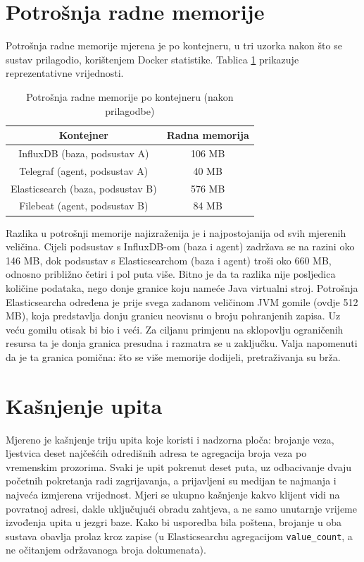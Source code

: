 \section{Potrošnja radne memorije}

Potrošnja radne memorije mjerena je po kontejneru, u tri uzorka nakon što se sustav prilagodio, korištenjem Docker statistike. Tablica \ref{tab:ram}
prikazuje reprezentativne vrijednosti.

\begin{table}[h]
\centering
    \begin{tabular}{|c|c|}
    \hline
    \textbf{Kontejner} & \textbf{Radna memorija} \\
    \hline
    InfluxDB (baza, podsustav A) & 106 MB \\
    Telegraf (agent, podsustav A) & 40 MB \\
    Elasticsearch (baza, podsustav B) & 576 MB \\
    Filebeat (agent, podsustav B) & 84 MB \\
    \hline
    \end{tabular}
    \caption{Potrošnja radne memorije po kontejneru (nakon prilagodbe)}
    \label{tab:ram}
\end{table}

Razlika u potrošnji memorije najizraženija je i najpostojanija od svih mjerenih veličina. Cijeli podsustav s InfluxDB-om (baza i agent) zadržava se na razini
oko 146 MB, dok podsustav s Elasticsearchom (baza i agent) troši oko 660 MB, odnosno približno četiri i pol puta više. Bitno je da ta razlika nije posljedica
količine podataka, nego donje granice koju nameće Java virtualni stroj. Potrošnja Elasticsearcha određena je prije svega zadanom veličinom JVM gomile
(ovdje 512 MB), koja predstavlja donju granicu neovisnu o broju pohranjenih zapisa. Uz veću gomilu otisak bi bio i veći. Za ciljanu primjenu na sklopovlju
ograničenih resursa ta je donja granica presudna i razmatra se u zaključku. Valja napomenuti da je ta granica pomična: što se više memorije dodijeli, pretraživanja su brža.

\section{Kašnjenje upita}

Mjereno je kašnjenje triju upita koje koristi i nadzorna ploča: brojanje veza, ljestvica deset najčešćih odredišnih adresa te agregacija broja veza po
vremenskim prozorima. Svaki je upit pokrenut deset puta, uz odbacivanje dvaju početnih pokretanja radi zagrijavanja, a prijavljeni su medijan te najmanja i
najveća izmjerena vrijednost. Mjeri se ukupno kašnjenje kakvo klijent vidi na povratnoj adresi, dakle uključujući obradu zahtjeva, a ne samo unutarnje vrijeme
izvođenja upita u jezgri baze. Kako bi usporedba bila poštena, brojanje u oba sustava obavlja prolaz kroz zapise (u Elasticsearchu agregacijom
\texttt{value\_count}, a ne očitanjem održavanoga broja dokumenata).

